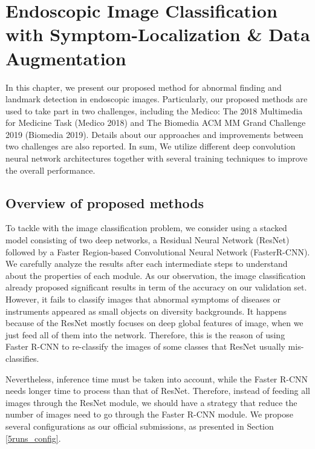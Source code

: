 \chapter{Endoscopic Image Classification with Symptom-Localization \&  Data Augmentation}
\label{chap-method-endoscopy}
\begin{ChapAbstract}
In this chapter, we present our proposed method for abnormal finding and landmark detection in endoscopic images. Particularly, our proposed methods are used to take part in two challenges, including the Medico: The 2018 Multimedia for Medicine Task (Medico 2018) and The Biomedia ACM MM Grand Challenge 2019 (Biomedia 2019). Details about our approaches and improvements between two challenges are also reported. In sum, We utilize different  deep convolution neural network architectures together with several training techniques to improve the overall performance.
\end{ChapAbstract}

\section{Overview of proposed methods}
To tackle with the image classification problem, we consider using a stacked model consisting of two deep networks, a Residual Neural Network (ResNet) followed by a Faster Region-based Convolutional Neural Network (FasterR-CNN). We carefully analyze the results after each intermediate steps to understand about the properties of each module. As our observation, the image classification already proposed significant results in term of the accuracy on our validation set. However, it fails to classify images that abnormal symptoms of diseases or instruments appeared as  small objects on diversity backgrounds. It happens because of the ResNet mostly focuses on deep global features of image, when we just feed all of them into the network. Therefore, this is the reason of using Faster R-CNN to re-classify the images of some classes that ResNet usually mis-classifies. 

Nevertheless, inference time must be taken into account, while the Faster R-CNN needs longer time to process than that of ResNet. Therefore, instead of feeding all images through the ResNet module, we should have a strategy that reduce the number of images need to go through the Faster R-CNN module. We propose several configurations as our official submissions, as presented in Section \ref{5runs_config}.


